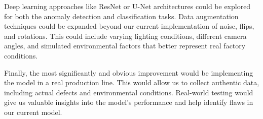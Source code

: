 Deep learning approaches like ResNet or U-Net architectures could be explored for both the anomaly detection and classification tasks.
Data augmentation techniques could be expanded beyond our current implementation of noise, flips, and rotations. This could include varying lighting conditions, different camera angles, and simulated environmental factors that better represent real factory conditions.

Finally, the most significantly and obvious improvement would be implementing the model in a real production line. 
This would allow us to collect authentic data, including actual defects and environmental conditions. 
Real-world testing would give us valuable insights into the model's performance and help identify flaws in our current model.
